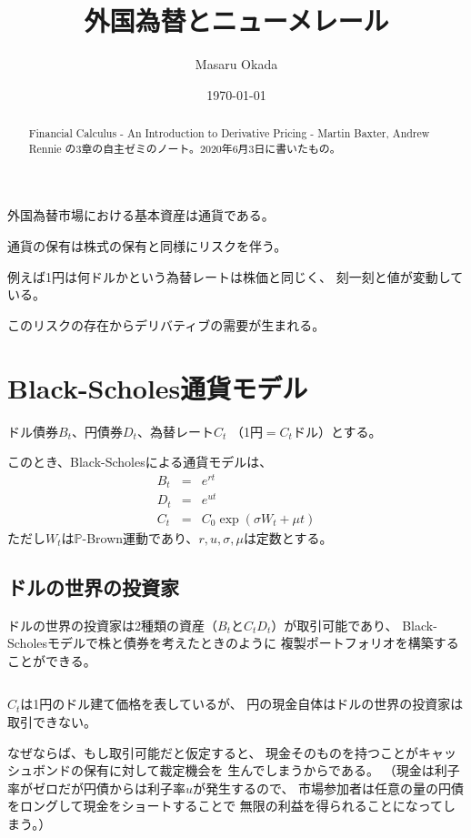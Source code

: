 \documentclass[uplatex,a4j,12pt,dvipdfmx]{jsarticle}
\title{外国為替とニューメレール}
\author{Masaru Okada
}
\date{ \today }
\begin{document}
\maketitle

\begin{abstract}
	Financial Calculus - An Introduction to Derivative Pricing - Martin Baxter, Andrew Rennie の3章の自主ゼミのノート。2020年6月3日に書いたもの。
\end{abstract}

外国為替市場における基本資産は通貨である。

通貨の保有は株式の保有と同様にリスクを伴う。

例えば1円は何ドルかという為替レートは株価と同じく、
刻一刻と値が変動している。

このリスクの存在からデリバティブの需要が生まれる。
\section{Black-Scholes通貨モデル}

ドル債券$B_{t}$、円債券$D_{t}$、為替レート$C_{t}$
（1円$=C_{t}$ドル）とする。

このとき、Black-Scholesによる通貨モデルは、
%
%
%
\begin{eqnarray*}
	B_{t}
	&=&
	e^{rt}
	\\
	D_{t}
	&=&
	e^{ut}
	\\
	C_{t}
	&=&
	C_{0} \exp (\sigma W_{t} + \mu t )
\end{eqnarray*}
%
%
%
ただし$W_{t}$は$\mathbb{P}$-Brown運動であり、$r,u,\sigma,\mu$は定数とする。

\subsection{ドルの世界の投資家}

ドルの世界の投資家は2種類の資産（$B_{t}$と$C_{t}D_{t}$）が取引可能であり、
Black-Scholesモデルで株と債券を考えたときのように
複製ポートフォリオを構築することができる。

${}$

$C_{t}$は1円のドル建て価格を表しているが、
円の現金自体はドルの世界の投資家は取引できない。

なぜならば、もし取引可能だと仮定すると、
現金そのものを持つことがキャッシュボンドの保有に対して裁定機会を
生んでしまうからである。
（現金は利子率がゼロだが円債からは利子率$u$が発生するので、
市場参加者は任意の量の円債をロングして現金をショートすることで
無限の利益を得られることになってしまう。）
\end{document}
